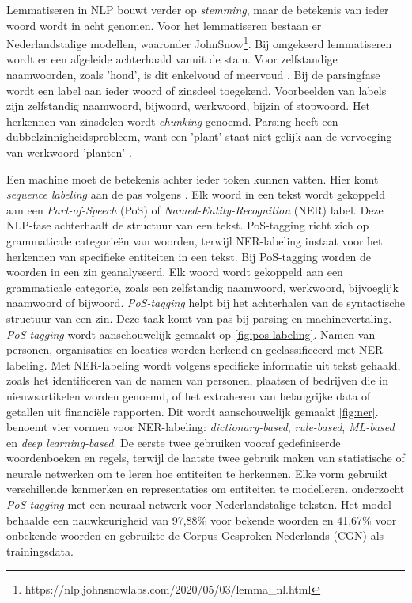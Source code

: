 \medspace

Lemmatiseren in NLP bouwt verder op \textit{stemming}, maar de betekenis van ieder woord wordt in acht genomen. Voor het lemmatiseren bestaan er Nederlandstalige modellen, waaronder JohnSnow\footnote{https://nlp.johnsnowlabs.com/2020/05/03/lemma\_nl.html}. Bij omgekeerd lemmatiseren wordt er een afgeleide achterhaald vanuit de stam. Voor zelfstandige naamwoorden, zoals 'hond', is dit enkelvoud of meervoud \autocite{Eisenstein2019}. Bij de parsingfase wordt een label aan ieder woord of zinsdeel toegekend. Voorbeelden van labels zijn zelfstandig naamwoord, bijwoord, werkwoord, bijzin of stopwoord. Het herkennen van zinsdelen wordt \textit{chunking} genoemd. Parsing heeft een dubbelzinnigheidsprobleem, want een 'plant' staat niet gelijk aan de vervoeging van werkwoord 'planten' \autocite{Eisenstein2019}.

\medspace

Een machine moet de betekenis achter ieder token kunnen vatten. Hier komt \textit{sequence labeling} aan de pas volgens \textcite{Eisenstein2019}. Elk woord in een tekst wordt gekoppeld aan een \textit{Part-of-Speech} (PoS) of \textit{Named-Entity-Recognition} (NER) label. Deze NLP-fase achterhaalt de structuur van een tekst. PoS-tagging richt zich op grammaticale categorieën van woorden, terwijl NER-labeling instaat voor het herkennen van specifieke entiteiten in een tekst. Bij PoS-tagging worden de woorden in een zin geanalyseerd. Elk woord wordt gekoppeld aan een grammaticale categorie, zoals een zelfstandig naamwoord, werkwoord, bijvoeglijk naamwoord of bijwoord. \textit{PoS-tagging} helpt bij het achterhalen van de syntactische structuur van een zin. Deze taak komt van pas bij parsing en machinevertaling. \textit{PoS-tagging} wordt aanschouwelijk gemaakt op \ref{fig:pos-labeling}. Namen van personen, organisaties en locaties worden herkend en geclassificeerd met NER-labeling. Met NER-labeling wordt volgens \textcite{Jurafsky2014} specifieke informatie uit tekst gehaald, zoals het identificeren van de namen van personen, plaatsen of bedrijven die in nieuwsartikelen worden genoemd, of het extraheren van belangrijke data of getallen uit financiële rapporten. Dit wordt aanschouwelijk gemaakt \ref{fig:ner}. \textcite{Li2018} benoemt vier vormen voor NER-labeling: \textit{dictionary-based}, \textit{rule-based}, \textit{ML-based} en \textit{deep learning-based}. De eerste twee gebruiken vooraf gedefinieerde woordenboeken en regels, terwijl de laatste twee gebruik maken van statistische of neurale netwerken om te leren hoe entiteiten te herkennen. Elke vorm gebruikt verschillende kenmerken en representaties om entiteiten te modelleren. \textcite{Poel2008} onderzocht \textit{PoS-tagging} met een neuraal netwerk voor Nederlandstalige teksten. Het model behaalde een nauwkeurigheid van 97,88\% voor bekende woorden en 41,67\% voor onbekende woorden en gebruikte de Corpus Gesproken Nederlands (CGN) als trainingsdata.

